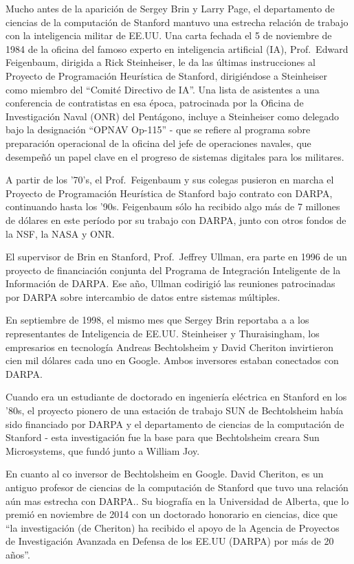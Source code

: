 \documentclass[10pt,a5paper,twoside,spanish,]{book}
\begin{document}
Mucho antes de la aparición de Sergey Brin y Larry Page, el departamento
de ciencias de la computación de Stanford mantuvo una estrecha relación
de trabajo con la inteligencia militar de EE.UU. Una carta fechada el 5
de noviembre de 1984 de la oficina del famoso experto en inteligencia
artificial (IA), Prof.~Edward Feigenbaum, dirigida a Rick Steinheiser,
le da las últimas instrucciones al Proyecto de Programación Heurística
de Stanford, dirigiéndose a Steinheiser como miembro del ``Comité
Directivo de IA''. Una lista de asistentes a una conferencia de
contratistas en esa época, patrocinada por la Oficina de Investigación
Naval (ONR) del Pentágono, incluye a Steinheiser como delegado bajo la
designación ``OPNAV Op-115'' - que se refiere al programa sobre
preparación operacional de la oficina del jefe de operaciones navales,
que desempeñó un papel clave en el progreso de sistemas digitales para
los militares.

A partir de los '70's, el Prof.~Feigenbaum y sus colegas pusieron en
marcha el Proyecto de Programación Heurística de Stanford bajo contrato
con DARPA, continuando hasta los '90s. Feigenbaum sólo ha recibido algo
más de 7 millones de dólares en este período por su trabajo con DARPA,
junto con otros fondos de la NSF, la NASA y ONR.

El supervisor de Brin en Stanford, Prof.~Jeffrey Ullman, era parte en
1996 de un proyecto de financiación conjunta del Programa de Integración
Inteligente de la Información de DARPA. Ese año, Ullman codirigió las
reuniones patrocinadas por DARPA sobre intercambio de datos entre
sistemas múltiples.

En septiembre de 1998, el mismo mes que Sergey Brin reportaba a a los
representantes de Inteligencia de EE.UU. Steinheiser y Thuraisingham,
los empresarios en tecnología Andreas Bechtolsheim y David Cheriton
invirtieron cien mil dólares cada uno en Google. Ambos inversores
estaban conectados con DARPA.

Cuando era un estudiante de doctorado en ingeniería eléctrica en
Stanford en los '80s, el proyecto pionero de una estación de trabajo SUN
de Bechtolsheim había sido financiado por DARPA y el departamento de
ciencias de la computación de Stanford - esta investigación fue la base
para que Bechtolsheim creara Sun Microsystems, que fundó junto a William
Joy.

En cuanto al co inversor de Bechtolsheim en Google. David Cheriton, es
un antiguo profesor de ciencias de la computación de Stanford que tuvo
una relación aún mas estrecha con DARPA.. Su biografía en la Universidad
de Alberta, que lo premió en noviembre de 2014 con un doctorado
honorario en ciencias, dice que ``la investigación (de Cheriton) ha
recibido el apoyo de la Agencia de Proyectos de Investigación Avanzada
en Defensa de los EE.UU (DARPA) por más de 20 años''.
\end{document}
